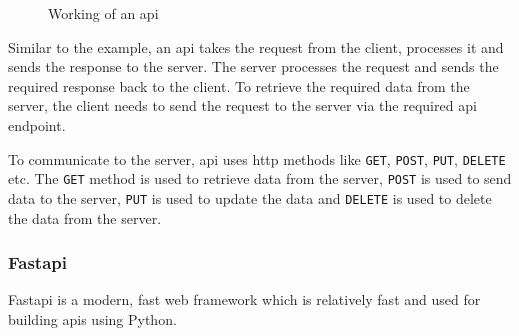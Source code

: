 \begin{figure}[!ht]
  \caption{Working of an \acrshort{api}}
  \label{api_working}
\end{figure}

Similar to the example, an \acrshort{api} takes the request from the client, processes it and sends the response to the server. The server processes the request
and sends the required response back to the client. To retrieve the required data from the server, the client needs to send the request to the server via the
required \acrshort{api} endpoint.

To communicate to the server, \acrshort{api} uses \acrshort{http} methods like \texttt{GET}, \texttt{POST}, \texttt{PUT}, \texttt{DELETE} etc. The \texttt{GET}
method is used to retrieve data from the server, \texttt{POST} is used to send data to the server, \texttt{PUT} is used to update the data and \texttt{DELETE}
is used to delete the data from the server.
\subsubsection{Fast\acrshort{api}}
Fast\acrshort{api} is a modern, fast web framework which is relatively fast and used for building \acrshort{api}s using Python. 

